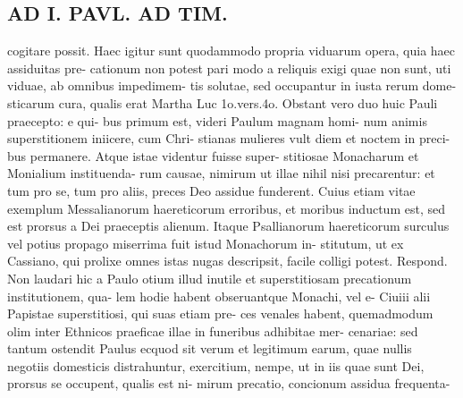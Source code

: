 \documentclass{article}
\begin{document}
\begin{pages}
\section*{AD I. PAVL. AD TIM. }
\marginpar{[ p.260 ]}cogitare possit. Haec igitur sunt quodammodo propria viduarum opera, quia haec assiduitas pre- cationum non potest pari modo a reliquis exigi quae non sunt, uti viduae, ab omnibus impedimem- tis solutae, sed occupantur in iusta rerum dome- sticarum cura, qualis erat Martha Luc 1o.vers.4o. Obstant vero duo huic Pauli praecepto: e qui- bus primum est, videri Paulum magnam homi- num animis superstitionem iniicere, cum Chri- stianas mulieres vult diem et noctem in preci- bus permanere. Atque istae videntur fuisse super- stitiosae Monacharum et Monialium instituenda- rum causae, nimirum ut illae nihil nisi precarentur: et tum pro se, tum pro aliis, preces Deo assidue funderent. Cuius etiam vitae exemplum Messalianorum haereticorum erroribus, et moribus inductum est, sed est prorsus a Dei praeceptis alienum. Itaque Psallianorum haereticorum surculus vel potius propago miserrima fuit istud Monachorum in- stitutum, ut ex Cassiano, qui prolixe omnes istas nugas descripsit, facile colligi potest. Respond. Non laudari hic a Paulo otium illud inutile et superstitiosam precationum institutionem, qua- lem hodie habent obseruantque Monachi, vel e- Ciuiii alii Papistae superstitiosi, qui suas etiam pre- ces venales habent, quemadmodum olim inter Ethnicos praeficae illae in funeribus adhibitae mer- cenariae: sed tantum ostendit Paulus ecquod sit verum et legitimum earum, quae nullis negotiis domesticis distrahuntur, exercitium, nempe, ut in iis quae sunt Dei, prorsus se occupent, qualis est ni- mirum precatio, concionum assidua frequenta- 

\end{pages}
\end{document}
